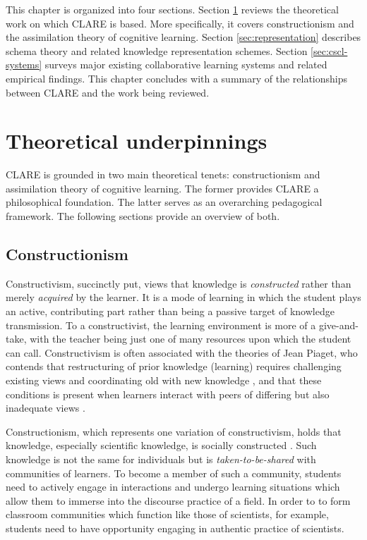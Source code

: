 This chapter is organized into four sections. Section \ref{sec:theory}
reviews the theoretical work on which CLARE is based.  More specifically,
it covers constructionism and the assimilation theory of cognitive
learning. Section \ref{sec:representation} describes schema theory and
related knowledge representation schemes.  Section \ref{sec:cscl-systems}
surveys major existing collaborative learning systems and related empirical
findings.  This chapter concludes with a summary of the relationships
between CLARE and the work being reviewed.



\section{Theoretical underpinnings}
\label{sec:theory}

CLARE is grounded in two main theoretical tenets: constructionism and
assimilation theory of cognitive learning. The former provides CLARE a
philosophical foundation. The latter serves as an overarching pedagogical
framework. The following sections provide an overview of both.

\subsection{Constructionism}

Constructivism, succinctly put, views that knowledge is {\it constructed\/}
rather than merely {\it acquired\/} by the learner. It is a mode of
learning in which the student plays an active, contributing part rather
than being a passive target of knowledge transmission. To a constructivist,
the learning environment is more of a give-and-take, with the teacher being
just one of many resources upon which the student can call. Constructivism
is often associated with the theories of Jean Piaget, who contends that
restructuring of prior knowledge (learning) requires challenging existing
views and coordinating old with new knowledge \cite{Piaget77}, and that
these conditions is present when learners interact with peers of differing
but also inadequate views \cite{Piaget32}.

Constructionism, which represents one variation of constructivism, holds
that knowledge, especially scientific knowledge, is socially constructed
\cite{Berger66,Knorr-Cetina81}. Such knowledge is not the same for
individuals but is {\it taken-to-be-shared\/} \cite{Roth92} with
communities of learners. To become a member of such a community, students
need to actively engage in interactions and undergo learning situations
which allow them to immerse into the discourse practice of a field. In
order to to form classroom communities which function like those of
scientists, for example, students need to have opportunity engaging in
authentic practice of scientists.

